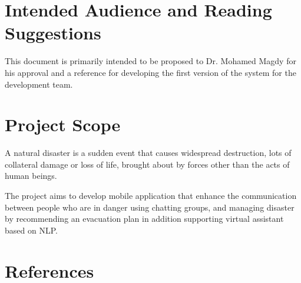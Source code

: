 \documentclass{scrreprt}
\begin{document}

\section{Intended Audience and Reading Suggestions}

This document is primarily intended to be proposed to Dr. Mohamed Magdy for his approval and a reference for developing the first version of the system for the development team.

\section{Project Scope}

A natural disaster is a sudden event that causes widespread destruction, lots of collateral damage or loss of life, brought about by forces other than the acts of human beings.

The project aims to develop mobile application that enhance the
communication between people who are in danger using chatting groups, and managing disaster by recommending an evacuation plan in addition supporting virtual assistant based on NLP.

\section{References}
\end{document}
